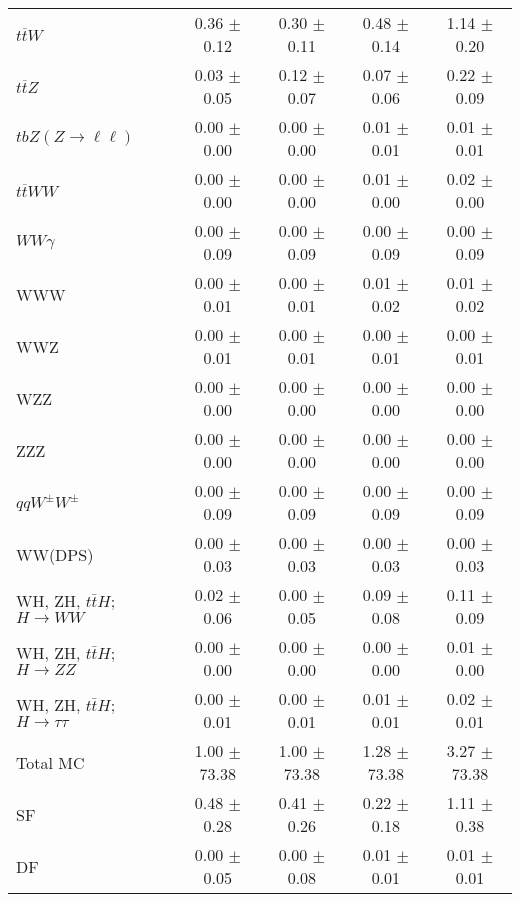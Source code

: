 \begin{tabular}{l|cccc}
                   $t\overline{t}W$ &  0.36 $\pm$  0.12 &  0.30 $\pm$  0.11 &  0.48 $\pm$  0.14 &  1.14 $\pm$  0.20 \\
                   $t\overline{t}Z$ &  0.03 $\pm$  0.05 &  0.12 $\pm$  0.07 &  0.07 $\pm$  0.06 &  0.22 $\pm$  0.09 \\
    $tbZ (Z \rightarrow \ell \ell)$ &  0.00 $\pm$  0.00 &  0.00 $\pm$  0.00 &  0.01 $\pm$  0.01 &  0.01 $\pm$  0.01 \\
                  $t\overline{t}WW$ &  0.00 $\pm$  0.00 &  0.00 $\pm$  0.00 &  0.01 $\pm$  0.00 &  0.02 $\pm$  0.00 \\
                         $WW\gamma$ &  0.00 $\pm$  0.09 &  0.00 $\pm$  0.09 &  0.00 $\pm$  0.09 &  0.00 $\pm$  0.09 \\
                                WWW &  0.00 $\pm$  0.01 &  0.00 $\pm$  0.01 &  0.01 $\pm$  0.02 &  0.01 $\pm$  0.02 \\
                                WWZ &  0.00 $\pm$  0.01 &  0.00 $\pm$  0.01 &  0.00 $\pm$  0.01 &  0.00 $\pm$  0.01 \\
                                WZZ &  0.00 $\pm$  0.00 &  0.00 $\pm$  0.00 &  0.00 $\pm$  0.00 &  0.00 $\pm$  0.00 \\
                                ZZZ &  0.00 $\pm$  0.00 &  0.00 $\pm$  0.00 &  0.00 $\pm$  0.00 &  0.00 $\pm$  0.00 \\
                 $qqW^{\pm}W^{\pm}$ &  0.00 $\pm$  0.09 &  0.00 $\pm$  0.09 &  0.00 $\pm$  0.09 &  0.00 $\pm$  0.09 \\
                            WW(DPS) &  0.00 $\pm$  0.03 &  0.00 $\pm$  0.03 &  0.00 $\pm$  0.03 &  0.00 $\pm$  0.03 \\
WH, ZH, $t\bar{t}H$; $H \rightarrow WW$ &  0.02 $\pm$  0.06 &  0.00 $\pm$  0.05 &  0.09 $\pm$  0.08 &  0.11 $\pm$  0.09 \\
WH, ZH, $t\bar{t}H$; $H \rightarrow ZZ$ &  0.00 $\pm$  0.00 &  0.00 $\pm$  0.00 &  0.00 $\pm$  0.00 &  0.01 $\pm$  0.00 \\
WH, ZH, $t\bar{t}H$; $H \rightarrow \tau\tau$ &  0.00 $\pm$  0.01 &  0.00 $\pm$  0.01 &  0.01 $\pm$  0.01 &  0.02 $\pm$  0.01 \\
\hline\hline
                           Total MC &  1.00 $\pm$ 73.38 &  1.00 $\pm$ 73.38 &  1.28 $\pm$ 73.38 &  3.27 $\pm$ 73.38 \\
\hline
                                 SF &  0.48 $\pm$  0.28 &  0.41 $\pm$  0.26 &  0.22 $\pm$  0.18 &  1.11 $\pm$  0.38 \\
                                 DF &  0.00 $\pm$  0.05 &  0.00 $\pm$  0.08 &  0.01 $\pm$  0.01 &  0.01 $\pm$  0.01 \\

\end{tabular}
